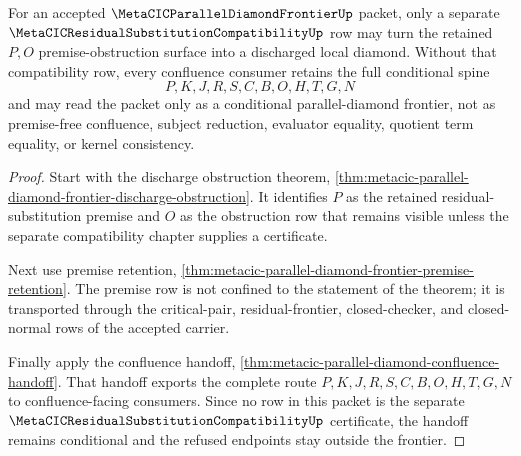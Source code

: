 \begin{theorem}
\label{thm:metacic-parallel-diamond-frontier-compatibility-discharge-surface}
For an accepted $\MetaCICParallelDiamondFrontierUp$ packet, only a separate $\MetaCICResidualSubstitutionCompatibilityUp$ row may turn the retained $P,O$ premise-obstruction surface into a discharged local diamond. Without that compatibility row, every confluence consumer retains the full conditional spine
$$
P,K,J,R,S,C,B,O,H,T,G,N
$$
and may read the packet only as a conditional parallel-diamond frontier, not as premise-free confluence, subject reduction, evaluator equality, quotient term equality, or kernel consistency.
\end{theorem}
\begin{proof}
Start with the discharge obstruction theorem, \autoref{thm:metacic-parallel-diamond-frontier-discharge-obstruction}. It identifies $P$ as the retained residual-substitution premise and $O$ as the obstruction row that remains visible unless the separate compatibility chapter supplies a certificate.

Next use premise retention, \autoref{thm:metacic-parallel-diamond-frontier-premise-retention}. The premise row is not confined to the statement of the theorem; it is transported through the critical-pair, residual-frontier, closed-checker, and closed-normal rows of the accepted carrier.

Finally apply the confluence handoff, \autoref{thm:metacic-parallel-diamond-confluence-handoff}. That handoff exports the complete route $P,K,J,R,S,C,B,O,H,T,G,N$ to confluence-facing consumers. Since no row in this packet is the separate $\MetaCICResidualSubstitutionCompatibilityUp$ certificate, the handoff remains conditional and the refused endpoints stay outside the frontier.
\end{proof}

